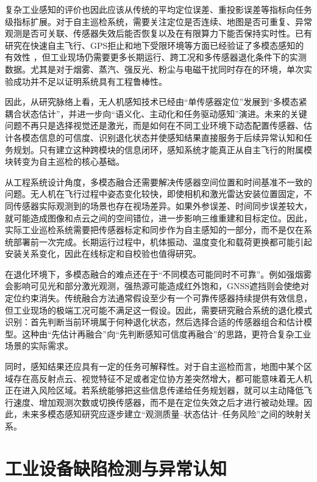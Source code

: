 复杂工业感知的评价也因此应该从传统的平均定位误差、重投影误差等指标向任务级指标扩展。对于自主巡检系统，需要关注定位是否连续、地图是否可重复、异常观测是否可关联、传感器失效后能否恢复以及在有限算力下能否保持实时性。已有研究在快速自主飞行、GPS拒止和地下受限环境等方面已经验证了多模态感知的有效性
\cite{mohta2018fast,petrlik2020robust}，但工业现场仍需要更多长期运行、跨工况和多传感器退化条件下的实测数据。尤其是对于烟雾、蒸汽、强反光、粉尘与电磁干扰同时存在的环境，单次实验成功并不足以证明系统具有工程鲁棒性。

因此，从研究脉络上看，无人机感知技术已经由“单传感器定位”发展到“多模态紧耦合状态估计”，并进一步向“语义化、主动化和任务驱动感知”演进。未来的关键问题不再只是选择视觉还是激光，而是如何在不同工业环境下动态配置传感器、估计各模态信息的可信度、识别退化状态并使感知结果直接服务于后续异常认知和任务规划。只有建立这种跨模块的信息闭环，感知系统才能真正从自主飞行的附属模块转变为自主巡检的核心基础。



从工程系统设计角度，多模态融合还需要解决传感器空间位置和时间基准不一致的问题。无人机在飞行过程中姿态变化较快，即使相机和激光雷达安装位置固定，不同传感器实际观测到的场景也存在视场差异。如果外参误差、时间同步误差较大，就可能造成图像和点云之间的空间错位，进一步影响三维重建和目标定位。因此，实际工业巡检系统需要把传感器标定和同步作为自主感知的一部分，而不是仅在系统部署前一次完成。长期运行过程中，机体振动、温度变化和载荷更换都可能引起安装关系变化，因此在线标定和自校验也值得研究。

在退化环境下，多模态融合的难点还在于“不同模态可能同时不可靠”。例如强烟雾会影响可见光和部分激光观测，强热源可能造成红外饱和，GNSS遮挡则会使绝对定位约束消失。传统融合方法通常假设至少有一个可靠传感器持续提供有效信息，但工业现场的极端工况可能不满足这一假设。因此，需要研究融合系统的退化模式识别：首先判断当前环境属于何种退化状态，然后选择合适的传感器组合和估计模型。这种由“先估计再融合”向“先判断感知可信度再融合”的思路，更符合复杂工业场景的实际需求。

同时，感知结果还应具有一定的任务可解释性。对于自主巡检而言，地图中某个区域存在高反射点云、视觉特征不足或者定位协方差突然增大，都可能意味着无人机正在进入风险区域。若系统能够把这些信息传递给任务规划器，就可以主动降低飞行速度、增加观测次数或切换传感器，而不是在定位失效之后才进行被动处理。因此，未来多模态感知研究应逐步建立“观测质量--状态估计--任务风险”之间的映射关系。

\section{工业设备缺陷检测与异常认知}

